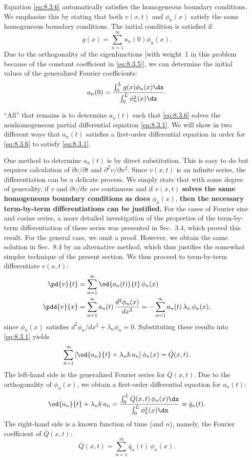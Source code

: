 Equation \eqref{eq:8.3.6} automatically satisfies the homogeneous boundary conditions.  We emphasize this by stating that both $v(x,t)$ and $\phi_n(x)$ satisfy the same homogeneous boundary conditions.  The initial condition is satisfied if
\[
g(x) = \sum_{n=1}^{\infty} a_n(0)\phi_n(x).
\]
Due to the orthogonality of the eigenfunctions [with weight~1 in this problem because of the constant coefficient in \eqref{eq:8.3.5}], we can determine the initial values of the generalized Fourier coefficients:
\begin{equation}
\label{eq:8.3.7}
a_n(0) = \frac{\int_0^L g(x)\phi_n(x)\dx}{\int_0^L \phi_n^2(x)\dx}.
\end{equation}

``All'' that remains is to determine $a_n(t)$ such that \eqref{eq:8.3.6} solves the nonhomogeneous partial differential equation \eqref{eq:8.3.1}.  We will show in two different ways that $a_n(t)$ satisfies a first-order differential equation in order for \eqref{eq:8.3.6} to satisfy \eqref{eq:8.3.1}.

One method to determine $a_n(t)$ is by direct substitution.  This is easy to do but requires calculation of $\partial v/\partial t$ and $\partial^2 v/\partial x^2$.  Since $v(x,t)$ is an infinite series, the differentiation can be a delicate process.  We simply state that with some degree of generality, if $v$ and $\partial v/\partial x$ are continuous and if $v(x,t)$ \textbf{solves the same homogeneous boundary conditions as does} $\phi_n(x)$, \textbf{then the necessary term-by-term differentiations can be justified.}  For the cases of Fourier sine and cosine series, a more detailed investigation of the properties of the term-by-term differentiation of these series was presented in Sec.~3.4, which proved this result.  For the general case, we omit a proof.  However, we obtain the same solution in Sec.~8.4 by an alternative method, which thus justifies the somewhat simpler technique of the present section.  We thus proceed to term-by-term differentiate $v(x,t)$:
\begin{align*}
\pd{v}{t} &= \sum_{n=1}^{\infty} \od{a_n(t)}{t}\,\phi_n(x) \\
\pdd{v}{x} &= \sum_{n=1}^{\infty} a_n(t)\,\frac{d^2\phi_n(x)}{dx^2}
= -\sum_{n=1}^{\infty} a_n(t)\,\lambda_n\,\phi_n(x),
\end{align*}
since $\phi_n(x)$ satisfies $d^2\phi_n/dx^2 + \lambda_n\phi_n = 0$.  Substituting these results into \eqref{eq:8.3.1} yields
\begin{equation}
\label{eq:8.3.8}
\sum_{n=1}^{\infty} \left[\od{a_n}{t} + \lambda_n k\,a_n\right]\phi_n(x) = \bar{Q}(x,t).
\end{equation}
The left-hand side is the generalized Fourier series for $\bar{Q}(x,t)$.  Due to the orthogonality of $\phi_n(x)$, we obtain a first-order differential equation for $a_n(t)$:
\begin{equation}
\label{eq:8.3.9}
\od{a_n}{t} + \lambda_n k\,a_n = \frac{\int_0^L \bar{Q}(x,t)\,\phi_n(x)\dx}{\int_0^L \phi_n^2(x)\dx} \equiv \bar{q}_n(t).
\end{equation}
The right-hand side is a known function of time (and $n$), namely, the Fourier coefficient of $\bar{Q}(x,t)$:
\[
\bar{Q}(x,t) = \sum_{n=1}^{\infty} \bar{q}_n(t)\,\phi_n(x).
\]

